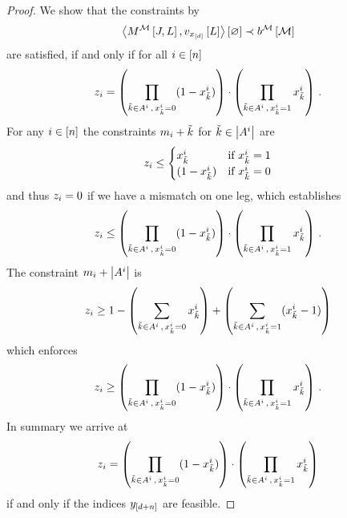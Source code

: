 \begin{proof}
	We show that the constraints by 
		\[ \left\langle M^{\mathcal{M}}\left[J,L\right],v_{x_{[d]}}\left[L\right]\right\rangle \left[ \varnothing \right] \prec b^{\mathcal{M}}\left[\mathcal{M}\right] \]
	are satisfied, if and only if for all $i\in[n]$
		\[ z_{i} 
		= \left( \prod_{\tilde{k}\in A^{i} \, , \,  x_{\tilde{k}}^i = 0} (1 - x_{\tilde{k}}^i) \right)
		\cdot \left( \prod_{\tilde{k}\in A^{i} \, , \,  x_{\tilde{k}}^i = 1}  x_{\tilde{k}}^i \right) \, . 
		 \]
	For any $i\in[n]$ the constraints $m_{i}+\tilde{k}$ for $\tilde{k}\in\left|A^{i}\right|$ are 
	\begin{align*}
		z_{i} \leq 
		\begin{cases}
			x_{\tilde{k}}^i  & \text{if } x_{\tilde{k}}^i = 1 \\
			(1- x_{\tilde{k}}^i ) & \text{if } x_{\tilde{k}}^i = 0 \\			
		\end{cases}
	\end{align*}
	and thus $z_{i}=0$ if we have a mismatch on one leg, which establishes 
		\[ z_{i} 
		\leq \left( \prod_{\tilde{k}\in A^{i} \, , \,  x_{\tilde{k}}^i = 0} (1 - x_{\tilde{k}}^i) \right)
		\cdot \left( \prod_{\tilde{k}\in A^{i} \, , \,  x_{\tilde{k}}^i = 1}  x_{\tilde{k}}^i \right) \, . 
		 \]
	The constraint $m_{i}+\left|A^{i}\right|$ is
	\begin{align*}
		z_{i} \geq 1 -
		 \left( \sum_{\tilde{k}\in A^{i} \, , \,  x_{\tilde{k}}^i = 0} x_{\tilde{k}}^i \right)
		 + \left( \sum_{\tilde{k}\in A^{i} \, , \,  x_{\tilde{k}}^i = 1}  (x_{\tilde{k}}^i - 1 )\right)
	\end{align*}
	which enforces 
		\[ z_{i} 
		\geq \left( \prod_{\tilde{k}\in A^{i} \, , \,  x_{\tilde{k}}^i = 0} (1 - x_{\tilde{k}}^i) \right)
		\cdot \left( \prod_{\tilde{k}\in A^{i} \, , \,  x_{\tilde{k}}^i = 1}  x_{\tilde{k}}^i \right)  \, . 
		 \]
	In summary we arrive at 
		\[ z_{i} 
		= \left( \prod_{\tilde{k}\in A^{i} \, , \,  x_{\tilde{k}}^i = 0} (1 - x_{\tilde{k}}^i) \right)
		\cdot \left( \prod_{\tilde{k}\in A^{i} \, , \,  x_{\tilde{k}}^i = 1}  x_{\tilde{k}}^i \right)  
		 \]
	if and only if the indices $y_{[d+n]}$ are feasible.
	

\end{proof}
